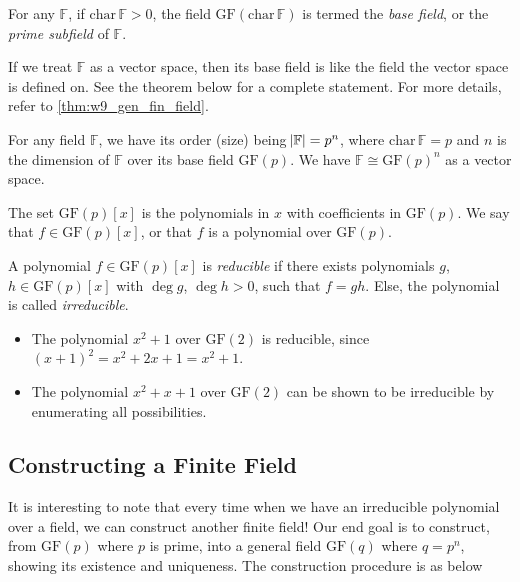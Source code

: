 \begin{definition}
    For any $\mathbb{F}$, if $\mathrm{char}\,\mathbb{F}>0$, the field $\mathrm{GF(\mathrm{char}\,\mathbb{F})}$ is termed the \textit{base field}, or the \textit{prime subfield} of $\mathbb{F}$.
\end{definition}
If we treat $\mathbb{F}$ as a vector space, then its base field is like the field the vector space is defined on. See the theorem below for a complete statement. For more details, refer to \autoref{thm:w9_gen_fin_field}.

\begin{theorem}
    For any field $\mathbb{F}$, we have its order (size) being $\abs{\mathbb{F}} = p^n$, where $\mathrm{char}\,\mathbb{F}=p$ and $n$ is the dimension of $\mathbb{F}$ over its base field $\mathrm{GF}(p)$. We have $\mathbb{F}\cong\mathrm{GF}(p)^n$ as a vector space.
\end{theorem}

\begin{definition}
    The set $\mathrm{GF}(p)[x]$ is the polynomials in $x$ with coefficients in $\mathrm{GF}(p)$. We say that $f\in\mathrm{GF}(p)[x]$, or that $f$ is a polynomial over $\mathrm{GF}(p)$.
\end{definition}

\begin{definition}[Reducibility]
    A polynomial $f\in\mathrm{GF}(p)[x]$ is \textit{reducible} if there exists polynomials $g$, $h\in\mathrm{GF}(p)[x]$ with $\deg g$, $\deg h>0$, such that $f=gh$. Else, the polynomial is called \textit{irreducible}.
\end{definition}
\begin{example}
    \begin{itemize}
        \item The polynomial $x^2+1$ over $\mathrm{GF}(2)$ is reducible, since $(x+1)^2 = x^2+2x+1=x^2+1$.
        \item The polynomial $x^2+x+1$ over $\mathrm{GF}(2)$ can be shown to be irreducible by enumerating all possibilities.
    \end{itemize}
\end{example}

\subsection{Constructing a Finite Field}
It is interesting to note that every time when we have an irreducible polynomial over a field, we can construct another finite field! Our end goal is to construct, from $\mathrm{GF}(p)$ where $p$ is prime, into a general field $\mathrm{GF}(q)$ where $q=p^n$, showing its existence and uniqueness. The construction procedure is as below

